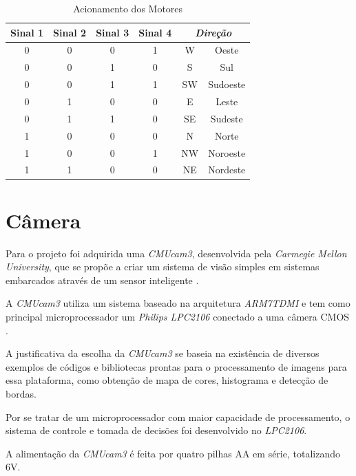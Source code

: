 \begin{table}[h!]
    \centering
    \begin{tabular}{|c|c|c|c|c|c|} \hline
        \textbf{Sinal 1} & \textbf{Sinal 2} & \textbf{Sinal 3} & \textbf{Sinal 4} & \multicolumn{2}{|c|}{\textit{Direção}} \\ \hline
        0 & 0 & 0 & 1 & W & Oeste \\ \hline
        0 & 0 & 1 & 0 & S & Sul \\ \hline
        0 & 0 & 1 & 1 & SW & Sudoeste \\ \hline
        0 & 1 & 0 & 0 & E & Leste \\ \hline
        0 & 1 & 1 & 0 & SE & Sudeste \\ \hline
        1 & 0 & 0 & 0 & N & Norte \\ \hline
        1 & 0 & 0 & 1 & NW & Noroeste \\ \hline
        1 & 1 & 0 & 0 & NE & Nordeste \\ \hline
    \end{tabular}
    \caption{Acionamento dos Motores}
    \label{sen_tbl01}
\end{table}

\section{Câmera}
\label{sec_camera}

Para o projeto foi adquirida uma \textit{CMUcam3}, desenvolvida pela \textit{Carmegie Mellon University}, que se propõe a criar um sistema de visão simples em sistemas embarcados através de um sensor inteligente \cite{cmucam01}.

A \textit{CMUcam3} utiliza um sistema baseado na arquitetura \textit{ARM7TDMI} e tem como principal microprocessador um \textit{Philips LPC2106} conectado a uma câmera CMOS \cite{cmucam02}.

A justificativa da escolha da \textit{CMUcam3} se baseia na existência de diversos exemplos de códigos e bibliotecas prontas para o processamento de imagens para essa plataforma, como obtenção de mapa de cores, histograma e detecção de bordas.

Por se tratar de um microprocessador com maior capacidade de processamento, o sistema de controle e tomada de decisões foi desenvolvido no \textit{LPC2106}.

A alimentação da \textit{CMUcam3} é feita por quatro pilhas AA em série, totalizando 6V. 


